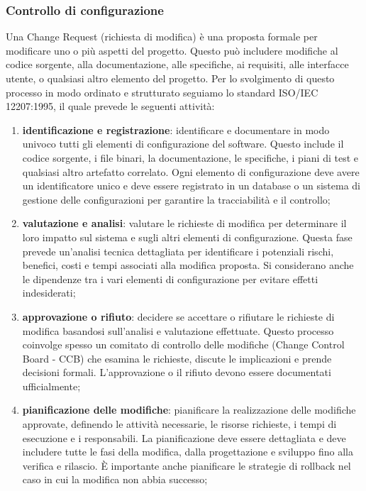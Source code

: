 \subsubsection{Controllo di configurazione}
Una Change Request (richiesta di modifica) è una proposta formale per modificare uno o più aspetti del progetto. Questo può includere modifiche al codice sorgente, alla documentazione, alle specifiche, ai requisiti, alle interfacce utente, o qualsiasi altro elemento del progetto. Per lo svolgimento di questo processo in modo ordinato e strutturato seguiamo lo standard ISO/IEC 12207:1995, il quale prevede le seguenti attività:
\begin{enumerate}
	\item \textbf{identificazione e registrazione}: identificare e documentare in modo univoco tutti gli elementi di configurazione del software. Questo include il codice sorgente, i file binari, la documentazione, le specifiche, i piani di test e qualsiasi altro artefatto correlato. Ogni elemento di configurazione deve avere un identificatore unico e deve essere registrato in un database o un sistema di gestione delle configurazioni per garantire la tracciabilità e il controllo;
	\item \textbf{valutazione e analisi}: valutare le richieste di modifica per determinare il loro impatto sul sistema e sugli altri elementi di configurazione. Questa fase prevede un'analisi tecnica dettagliata per identificare i potenziali rischi, benefici, costi e tempi associati alla modifica proposta. Si considerano anche le dipendenze tra i vari elementi di configurazione per evitare effetti indesiderati;
	\item \textbf{approvazione o rifiuto}: decidere se accettare o rifiutare le richieste di modifica basandosi sull'analisi e valutazione effettuate. Questo processo coinvolge spesso un comitato di controllo delle modifiche (Change Control Board - CCB) che esamina le richieste, discute le implicazioni e prende decisioni formali. L'approvazione o il rifiuto devono essere documentati ufficialmente;
	\item \textbf{pianificazione delle modifiche}: pianificare la realizzazione delle modifiche approvate, definendo le attività necessarie, le risorse richieste, i tempi di esecuzione e i responsabili. La pianificazione deve essere dettagliata e deve includere tutte le fasi della modifica, dalla progettazione e sviluppo fino alla verifica e rilascio. È importante anche pianificare le strategie di rollback nel caso in cui la modifica non abbia successo;

\end{enumerate}
